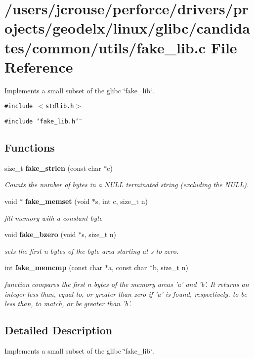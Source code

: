 \section{/users/jcrouse/perforce/drivers/projects/geodelx/linux/glibc/candidates/common/utils/fake\_\-lib.c File Reference}
\label{fake__lib_8c}
Implements a small subset of the glibc \char`\"{}fake\_\-lib\char`\"{}. 


{\tt \#include $<$stdlib.h$>$}\par
{\tt \#include \char`\"{}fake\_\-lib.h\char`\"{}}\par
\subsection*{Functions}
\begin{CompactItemize}
\item 
size\_\-t {\bf fake\_\-strlen} (const char $\ast$c)
\begin{CompactList}\small\item\em Counts the number of bytes in a NULL terminated string (excluding the NULL).\item\end{CompactList}\item 
void $\ast$ {\bf fake\_\-memset} (void $\ast$s, int c, size\_\-t n)
\begin{CompactList}\small\item\em fill memory with a constant byte\item\end{CompactList}\item 
void {\bf fake\_\-bzero} (void $\ast$s, size\_\-t n)
\begin{CompactList}\small\item\em sets the first n bytes of the byte area starting at s to zero.\item\end{CompactList}\item 
int {\bf fake\_\-memcmp} (const char $\ast$a, const char $\ast$b, size\_\-t n)
\begin{CompactList}\small\item\em function compares the first n bytes of the memory areas 'a' and 'b'. It returns an integer less than, equal to, or greater than zero if 'a' is found, respectively, to be less than, to match, or be greater than 'b'.\item\end{CompactList}\end{CompactItemize}


\subsection{Detailed Description}
Implements a small subset of the glibc \char`\"{}fake\_\-lib\char`\"{}.



